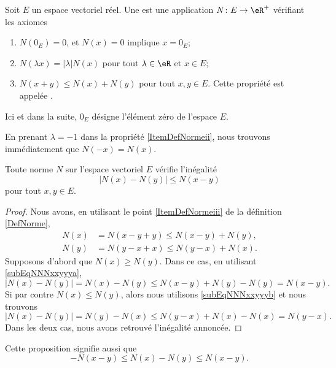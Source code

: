 \begin{definition}		\label{DefNorme}
	Soit $E$ un espace vectoriel réel. Une  est une application $N\colon E\to \eR^+$ vérifiant les axiomes 
	\begin{enumerate}

		\item
			$N(0_E)=0$, et $N(x)=0$ implique $x=0_E$;
		\item\label{ItemDefNormeii}
			$N(\lambda x)=| \lambda |N(x)$ pour tout $\lambda\in\eR$ et $x\in E$;
		\item\label{ItemDefNormeiii}
			$N(x+y)\leq N(x)+N(y)$ pour tout $x,y\in E$. Cette propriété est appelée .
	\end{enumerate}
	Ici et dans la suite, $0_E$ désigne l'élément zéro de l'espace $E$.
\end{definition}
En prenant $\lambda=-1$ dans la propriété \ref{ItemDefNormeii}, nous trouvons immédiatement que $N(-x)=N(x)$.

\begin{proposition}		\label{PropNmNNm}
	Toute norme $N$ sur l'espace vectoriel $E$ vérifie l'inégalité
	\begin{equation}
		\big| N(x)-N(y) \big|\leq N(x-y)
	\end{equation}
	pour tout $x,y\in E$.
\end{proposition}
	
\begin{proof}
	Nous avons, en utilisant le point \ref{ItemDefNormeiii} de la définition \ref{DefNorme},
	\begin{subequations}
		\begin{align}
			N(x)&=N(x-y+y)\leq N(x-y)+N(y),	\label{subEqNNNxxyyya}\\
			N(y)&=N(y-x+x)\leq N(y-x)+N(x).	\label{subEqNNNxxyyyb}
		\end{align}
	\end{subequations}
	Supposons d'abord que $N(x)\geq N(y)$. Dans ce cas, en utilisant \eqref{subEqNNNxxyyya},
	\begin{equation}
		\big| N(x)-N(y) \big|=N(x)-N(y)\leq N(x-y)+N(y)-N(y)=N(x-y).
	\end{equation}
	Si par contre $N(x)\leq N(y)$, alors nous utilisons \eqref{subEqNNNxxyyyb} et nous trouvons
	\begin{equation}
		\big| N(x)-N(y) \big|=N(y)-N(x)\leq N(y-x)+N(x)-N(x)=N(y-x).
	\end{equation}
	Dans les deux cas, nous avons retrouvé l'inégalité annoncée.
\end{proof}
Cette proposition signifie aussi que
\begin{equation}	\label{EqNleqNNleqNvqlqbs}
	-N(x-y)\leq N(x)-N(y)\leq N(x-y).
\end{equation}

